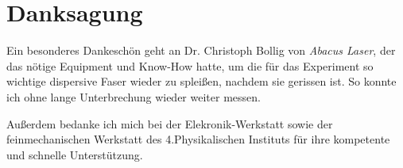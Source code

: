 \documentclass[bachelor,       %
               twoside,        %
               BCOR10mm,       %
               english,ngerman, %
               ]{GAUBM}
\begin{document}
\cleardoublepage
 

\chapter*{Danksagung}
Ein besonderes Dankeschön geht an Dr. Christoph Bollig von \textit{Abacus Laser}, der das nötige Equipment und Know-How hatte, um die für das Experiment so wichtige dispersive Faser wieder zu spleißen, nachdem sie gerissen ist.
So konnte ich ohne lange Unterbrechung wieder weiter messen.

Außerdem bedanke ich mich bei der Elekronik-Werkstatt sowie der feinmechanischen Werkstatt des 4.Physikalischen Instituts für ihre kompetente und schnelle Unterstützung.

\Declaration
\end{document}
